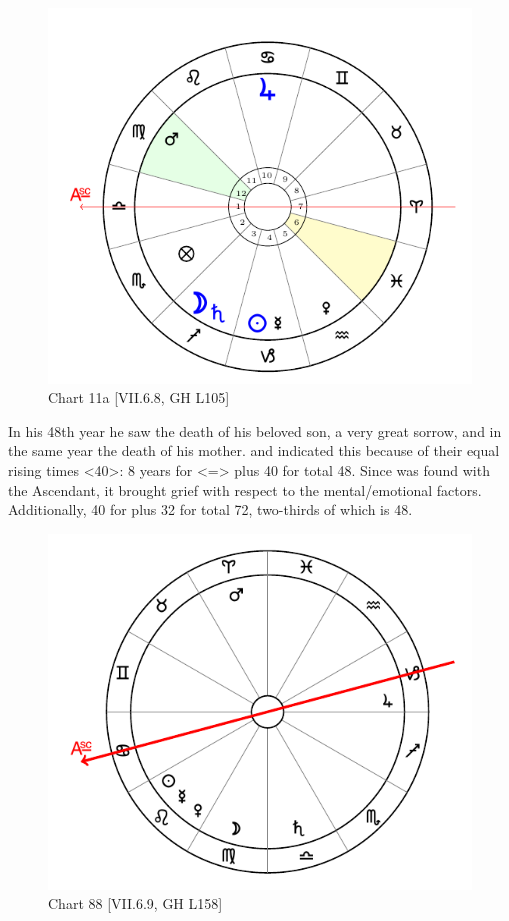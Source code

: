 \begin{figure}
\centering
\vspace{0pt}
\includegraphics[width=.68\textwidth]{charts/2_21_11}
\caption{Chart 11a [VII.6.8, GH L105] }
\label{fig:chart11a}
\end{figure} 

In his 48th year he saw the death of his beloved son, a very great sorrow, and in the same year the death of his mother. \Virgo\xspace and \Libra\xspace indicated this because of their equal rising times <40>: 8 years for \Libra\xspace <=\Venus> plus 40 for \Virgo\xspace total 48. Since \Mars\xspace was found with the Ascendant, it brought grief with respect to the mental/emotional factors. Additionally, 40 for \Virgo\xspace plus 32 for \Sagittarius\xspace total 72, two-thirds of which is 48.

\newpage

\begin{figure}
\centering
\vspace{0pt}
\includegraphics[width=.68\textwidth]{charts/7_6_09}
\caption{Chart 88 [VII.6.9, GH L158] }
\label{fig:chart88}
\end{figure} 

